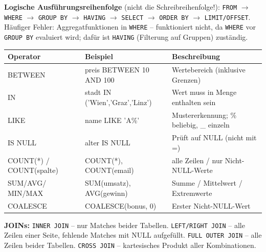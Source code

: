 
\textbf{Logische Ausführungsreihenfolge} (nicht die Schreibreihenfolge!): \texttt{FROM} $\to$ \texttt{WHERE} $\to$ \texttt{GROUP BY} $\to$ \texttt{HAVING} $\to$ \texttt{SELECT} $\to$ \texttt{ORDER BY} $\to$ \texttt{LIMIT/OFFSET}. Häufiger Fehler: Aggregatfunktionen in \texttt{WHERE} -- funktioniert nicht, da \texttt{WHERE} vor \texttt{GROUP BY} evaluiert wird; dafür ist \texttt{HAVING} (Filterung auf Gruppen) zuständig.


\begin{table}[H]
  \centering
  \begin{tabularx}{\linewidth}{L{4.0cm} L{4.5cm} L{6.5cm}}
    \textbf{Operator} & \textbf{Beispiel}               & \textbf{Beschreibung}                    \\
    \midrule
    BETWEEN                    & preis BETWEEN 10 AND 100        & Wertebereich (inklusive Grenzen)         \\
    IN                         & stadt IN ('Wien','Graz','Linz') & Wert muss in Menge enthalten sein        \\
    LIKE                       & name LIKE 'A\%'                 & Mustererkennung; \% beliebig, \_ einzeln \\
    IS NULL                    & alter IS NULL                   & Prüft auf NULL (nicht mit =)             \\
    COUNT(*) / COUNT(spalte)   & COUNT(*), COUNT(email)          & alle Zeilen / nur Nicht-NULL-Werte       \\
    SUM/AVG/ MIN/MAX            & SUM(umsatz), AVG(gewinn)        & Summe / Mittelwert / Extremwerte         \\
    COALESCE                   & COALESCE(bonus, 0)              & Erster Nicht-NULL-Wert                   \\
  \end{tabularx}
\end{table}

\textbf{JOINs:} \texttt{INNER JOIN} -- nur Matches beider Tabellen. \texttt{LEFT/RIGHT JOIN} -- alle Zeilen einer Seite, fehlende Matches mit NULL aufgefüllt. \texttt{FULL OUTER JOIN} -- alle Zeilen beider Tabellen. \texttt{CROSS JOIN} -- kartesisches Produkt aller Kombinationen.

